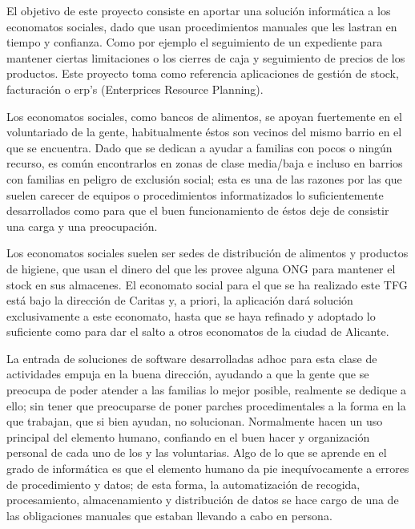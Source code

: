 El objetivo de este proyecto consiste en aportar una solución informática a los economatos sociales, dado que usan procedimientos manuales que les lastran en tiempo y confianza. Como por ejemplo el seguimiento de un expediente para mantener ciertas limitaciones o los cierres de caja y seguimiento de precios de los productos. Este proyecto toma como referencia aplicaciones de gestión de stock, facturación o erp's (Enterprices Resource Planning).
\vspace{1em}
\par Los economatos sociales, como bancos de alimentos, se apoyan fuertemente en el voluntariado de la gente, habitualmente éstos son vecinos del mismo barrio en el que se encuentra. Dado que se dedican a ayudar a familias con pocos o ningún recurso, es común encontrarlos en zonas de clase media/baja e incluso en barrios con familias en peligro de exclusión social; esta es una de las razones por las que suelen carecer de equipos o procedimientos informatizados lo suficientemente desarrollados como para que el buen funcionamiento de éstos deje de consistir una carga y una preocupación.
\vspace{1em}
\par Los economatos sociales suelen ser sedes de distribución de alimentos y productos de higiene, que usan el dinero del que les provee alguna ONG para mantener el stock en sus almacenes. El economato social para el que se ha realizado este TFG está bajo la dirección de Caritas y, a priori, la aplicación dará solución exclusivamente a este economato, hasta que se haya refinado y adoptado lo suficiente como para dar el salto a otros economatos de la ciudad de Alicante.
\vspace{1em}
\par La entrada de soluciones de software desarrolladas adhoc para esta clase de actividades empuja en la buena dirección, ayudando a que la gente que se preocupa de poder atender a las familias lo mejor posible, realmente se dedique a ello; sin tener que preocuparse de poner parches procedimentales a la forma en la que trabajan, que si bien ayudan, no solucionan. Normalmente hacen un uso principal del elemento humano, confiando en el buen hacer y organización personal de cada uno de los y las voluntarias. Algo de lo que se aprende en el grado de informática es que el elemento humano da pie inequívocamente a errores de procedimiento y datos; de esta forma, la automatización de recogida, procesamiento, almacenamiento y distribución de datos se hace cargo de una de las obligaciones manuales que estaban llevando a cabo en persona.
